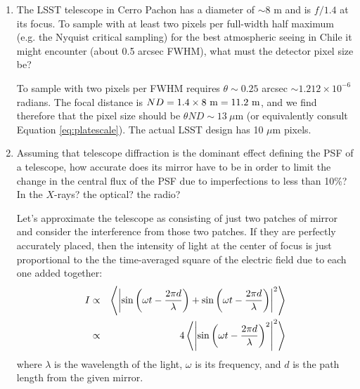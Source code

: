 \begin{enumerate}
\item The LSST telescope in Cerro Pachon has a diameter of $\sim 8$ m
    and is $f/1.4$ at its focus. To sample with at least two pixels
    per full-width half maximum (e.g. the Nyquist critical sampling)
    for the best atmospheric seeing in Chile it might encounter (about
    0.5 arcsec FWHM), what must the detector pixel size be?

\begin{answer}
To sample with two pixels per FWHM requires $\theta\sim 0.25$ arcsec
$\sim 1.212 \times 10^{-6}$ radians.  The focal distance is $N D =
1.4\times 8 {\rm ~m} = 11.2 {\rm ~m}$, and we find therefore that the
pixel size should be $\theta N D \sim 13~\mu$m (or equivalently
consult Equation \ref{eq:platescale}). The actual LSST design has 10
$\mu$m pixels.
\end{answer}

\item Assuming that telescope diffraction is the dominant effect
defining the PSF of a telescope, how accurate does its mirror have to
    be in order to limit the change in the central flux of the PSF due
    to imperfections to less than 10\%? In the $X$-rays? the optical?
    the radio?

\begin{answer}
Let's approximate the telescope as consisting of just two patches of
mirror and consider the interference from those two patches. If they
are perfectly accurately placed, then the intensity of light at the
center of focus is just proportional to the the time-averaged square
of the electric field due to each one added together:
\begin{eqnarray}
I &\propto& \left\langle
\left|
\sin\left(\omega t - \frac{2\pi d}{\lambda}\right) +
\sin\left(\omega t - \frac{2\pi d}{\lambda}\right)
\right|^2 \right\rangle \cr
&\propto& 4 \left\langle
\left|
\sin\left(\omega t - \frac{2\pi d}{\lambda}\right)^2
\right|^2 \right\rangle
\end{eqnarray}
where $\lambda$ is the wavelength of the light, $\omega$ is its
frequency, and $d$ is the path length from the given mirror.


\end{answer}
\end{enumerate}
